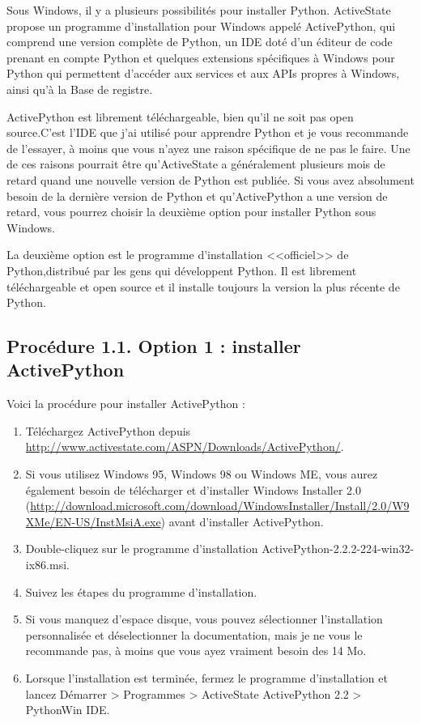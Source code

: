 Sous Windows, il y a plusieurs possibilités pour installer Python. ActiveState propose un programme d'installation pour Windows appelé ActivePython, qui comprend une version complète de Python, un IDE doté d'un éditeur de code prenant en compte Python et quelques extensions spécifiques à Windows pour Python qui permettent d'accéder aux services et aux APIs propres à Windows, ainsi qu'à la Base de registre.

ActivePython est librement téléchargeable, bien qu'il ne soit pas open source.C'est l'IDE que j'ai utilisé pour apprendre Python et je vous recommande de l'essayer, à moins que vous n'ayez une raison spécifique de ne pas le faire. Une de ces raisons pourrait être qu'ActiveState a généralement plusieurs mois de retard quand une nouvelle version de Python est publiée. Si vous avez absolument besoin de la dernière version de Python et qu'ActivePython a une version de retard, vous pourrez choisir la deuxième option pour installer Python sous Windows.

La deuxième option est le programme d'installation <<officiel>> de Python,distribué par les gens qui développent Python. Il est librement téléchargeable et open source et il installe toujours la version la plus récente de Python.

\subsection*{Procédure 1.1. Option 1 : installer ActivePython}

Voici la procédure pour installer ActivePython :

\begin{enumerate}
    \item{Téléchargez ActivePython depuis \url{http://www.activestate.com/ASPN/Downloads/ActivePython/}.}
    \item{Si vous utilisez Windows 95, Windows 98 ou Windows ME, vous aurez également besoin de télécharger et d'installer Windows Installer 2.0 (\url{http://download.microsoft.com/download/WindowsInstaller/Install/2.0/W9XMe/EN-US/InstMsiA.exe}) avant d'installer ActivePython.}
    \item{Double-cliquez sur le programme d'installation ActivePython-2.2.2-224-win32-ix86.msi.}
    \item{Suivez les étapes du programme d'installation.}
    \item{Si vous manquez d'espace disque, vous pouvez sélectionner l'installation personnalisée et déselectionner la documentation, mais je ne vous le recommande pas, à moins que vous ayez vraiment besoin des 14 Mo.}
    \item{Lorsque l'installation est terminée, fermez le programme d'installation et lancez Démarrer > Programmes > ActiveState ActivePython 2.2 > PythonWin IDE.}
\end{enumerate}

